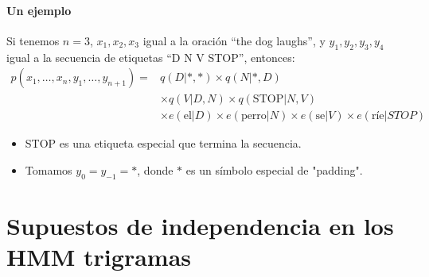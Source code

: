 \paragraph{Un ejemplo}

Si tenemos $n = 3$, $x_1, x_2, x_3$ igual a la oración ``the dog laughs'', y $y_1, y_2, y_3, y_4$ igual a la secuencia de etiquetas ``D N V STOP'', entonces:
\[
\begin{aligned}
p(x_1, \ldots, x_n, y_1, \ldots, y_{n+1}) = & q(D|*,*) \times q(N|*,D) \\
& \times q(V|D,N) \times q(\text{STOP}|N,V) \\
& \times e(\text{el}|D) \times e(\text{perro}|N) \times e(\text{se}|V) \times e(\text{ríe}|STOP)
\end{aligned}
\]
\begin{itemize}
  \item STOP es una etiqueta especial que termina la secuencia.
  \item Tomamos $y_0 = y_{-1} = *$, donde $*$ es un símbolo especial de "padding".
\end{itemize}

\section{Supuestos de independencia en los HMM trigramas}

